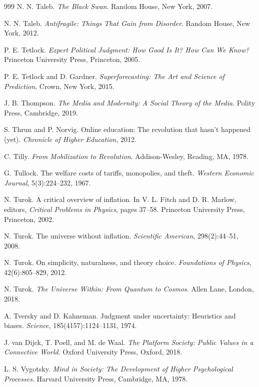 \documentclass[11pt]{article}
\begin{document}
\begin{thebibliography}{999}
N. N. Taleb.
\textit{The Black Swan}.
Random House, New York, 2007.

N. N. Taleb.
\textit{Antifragile: Things That Gain from Disorder}.
Random House, New York, 2012.

P. E. Tetlock.
\textit{Expert Political Judgment: How Good Is It? How Can We Know?}
Princeton University Press, Princeton, 2005.

P. E. Tetlock and D. Gardner.
\textit{Superforecasting: The Art and Science of Prediction}.
Crown, New York, 2015.

J. B. Thompson.
\textit{The Media and Modernity: A Social Theory of the Media}.
Polity Press, Cambridge, 2019.

S. Thrun and P. Norvig.
Online education: The revolution that hasn't happened (yet).
\textit{Chronicle of Higher Education}, 2012.

C. Tilly.
\textit{From Mobilization to Revolution}.
Addison-Wesley, Reading, MA, 1978.

G. Tullock.
The welfare costs of tariffs, monopolies, and theft.
\textit{Western Economic Journal}, 5(3):224--232, 1967.

N. Turok.
A critical overview of inflation.
In V. L. Fitch and D. R. Marlow, editors,
\textit{Critical Problems in Physics}, pages 37--58.
Princeton University Press, Princeton, 2002.

N. Turok.
The universe without inflation.
\textit{Scientific American}, 298(2):44--51, 2008.

N. Turok.
On simplicity, naturalness, and theory choice.
\textit{Foundations of Physics}, 42(6):805--829, 2012.

N. Turok.
\textit{The Universe Within: From Quantum to Cosmos}.
Allen Lane, London, 2018.

A. Tversky and D. Kahneman.
Judgment under uncertainty: Heuristics and biases.
\textit{Science}, 185(4157):1124--1131, 1974.

J. van Dijck, T. Poell, and M. de Waal.
\textit{The Platform Society: Public Values in a Connective World}.
Oxford University Press, Oxford, 2018.

L. S. Vygotsky.
\textit{Mind in Society: The Development of Higher Psychological Processes}.
Harvard University Press, Cambridge, MA, 1978.


\end{thebibliography}
\end{document}
